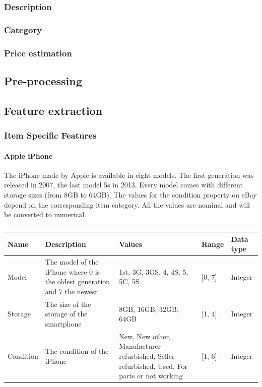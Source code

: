 \subsubsection{Description}
\subsubsection{Category}
\subsubsection{Price estimation}
\subsection{Pre-processing}
\subsection{Feature extraction}
\subsubsection{Item Specific Features}
\paragraph{Apple iPhone}
The iPhone made by Apple is available in eight models. The first generation was released in 2007, the last model 5s in 2013. Every model comes with different storage sizes (from 8GB to 64GB). The values for the condition property on eBay depend on the corresponding item category. All the values are nominal and will be converted to numerical.
\begin{table}[h!]
	\begin{center}
	\begin{tabular}{| l | p{5cm} | p{4cm} | l | l |}
		\hline
		Name & Description & Values & Range & Data type \\
		\hline
		Model & The model of the iPhone where 0 is the oldest generation and 7 the newest & 1st, 3G, 3GS, 4, 4S, 5, 5C, 5S & [0, 7] & Integer \\
		\hline
		Storage & The size of the storage of the smartphone & 8GB, 16GB, 32GB, 64GB & [1, 4] & Integer \\
		\hline
		Condition & The condition of the iPhone & New, New other, Manufacturer refurbished, Seller refurbished, Used, For parts or not working & [1, 6] & Integer \\
		\hline
	\end{tabular}
	\end{center}
	\caption{}
\end{table}

